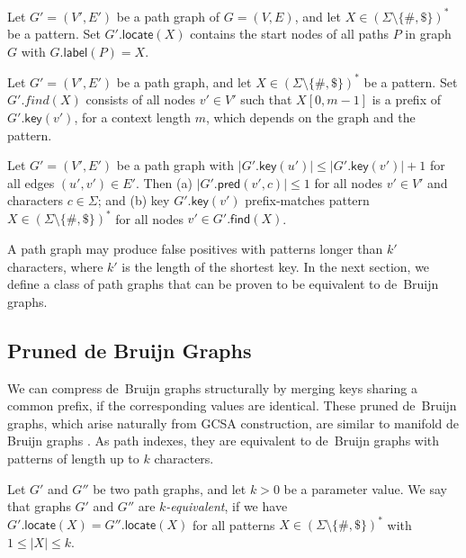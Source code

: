 \documentclass[twoside,leqno,twocolumn]{article}
\newcommand{\set}[1]{\ensuremath{\{ #1 \}}}
\newcommand{\abs}[1]{\ensuremath{\lvert #1 \rvert}}
\newcommand{\find}{\ensuremath{\mathsf{find}}}
\newcommand{\locate}{\ensuremath{\mathsf{locate}}}
\newcommand{\glabel}{\ensuremath{\mathsf{label}}}
\newcommand{\gpred}{\ensuremath{\mathsf{pred}}}
\newcommand{\gkey}{\ensuremath{\mathsf{key}}}
\newcommand{\kequivalent}[1]{$#1$\nobreakdash-equivalent}
\newcommand{\patternset}{\ensuremath{(\Sigma \setminus \set{\#, \$})^{\ast}}}
\begin{document}
\begin{lemma}\label{lemma:pg-fn}
Let $G' = (V', E')$ be a path graph of $G = (V, E)$, and let $X \in \patternset$ be a pattern. Set $G'.\locate(X)$ contains the start nodes of all paths $P$ in graph $G$ with $G.\glabel(P) = X$.
\end{lemma}

\begin{lemma}\label{lemma:pg-context}
Let $G' = (V', E')$ be a path graph, and let $X \in \patternset$ be a pattern. Set $G'.find(X)$ consists of all nodes $v' \in V'$ such that $X[0, m-1]$ is a prefix of $G'.\gkey(v')$, for a context length $m$, which depends on the graph and the pattern.
\end{lemma}

\begin{lemma}\label{lemma:pg-keys}
Let $G' = (V', E')$ be a path graph with $\abs{G'.\gkey(u')} \le \abs{G'.\gkey(v')}+1$ for all edges $(u', v') \in E'$. Then
(a) $\abs{G'.\gpred(v', c)} \le 1$ for all nodes $v' \in V'$ and characters $c \in \Sigma$; and
(b) key $G'.\gkey(v')$ prefix-matches pattern $X \in \patternset$ for all nodes $v' \in G'.\find(X)$.
\end{lemma}

A path graph may produce false positives with patterns longer than $k'$ characters, where $k'$ is the length of the shortest key. In the next section, we define a class of path graphs that can be proven to be equivalent to de~Bruijn graphs.

\subsection{Pruned de Bruijn Graphs}

We can compress de~Bruijn graphs structurally by merging keys sharing a common prefix, if the corresponding values are identical. These pruned de~Bruijn graphs, which arise naturally from GCSA construction, are similar to manifold de Bruijn graphs \cite{Lin2014}. As path indexes, they are equivalent to de~Bruijn graphs with patterns of length up to $k$ characters.

\begin{Definition}
Let $G'$ and $G''$ be two path graphs, and let $k > 0$ be a parameter value. We say that graphs $G'$ and $G''$ are \emph{\kequivalent{k}}, if we have $G'.\locate(X) = G''.\locate(X)$ for all patterns $X \in \patternset$ with $1 \le \abs{X} \le k$.
\end{Definition}
\end{document}
